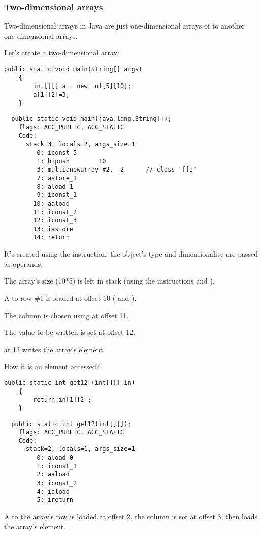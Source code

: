 \subsubsection{Two-dimensional arrays}

Two-dimensional arrays in Java are just one-dimensional arrays of  to another 
one-dimensional arrays.


Let's create a two-dimensional array:

\begin{lstlisting}[style=customjava]
	public static void main(String[] args)
	{
		int[][] a = new int[5][10];
		a[1][2]=3;
	}
\end{lstlisting}

\begin{lstlisting}
  public static void main(java.lang.String[]);
    flags: ACC_PUBLIC, ACC_STATIC
    Code:
      stack=3, locals=2, args_size=1
         0: iconst_5      
         1: bipush        10
         3: multianewarray #2,  2      // class "[[I"
         7: astore_1      
         8: aload_1       
         9: iconst_1      
        10: aaload        
        11: iconst_2      
        12: iconst_3      
        13: iastore       
        14: return        
\end{lstlisting}

It's created using the  instruction: the object's type and dimensionality are passed
as operands.

The array's size (10*5) is left in stack (using the instructions  and ).


A  to row \#1 is loaded at offset 10 ( and ).

The column is chosen using  at offset 11.

The value to be written is set at offset 12.

 at 13 writes the array's element.


How it is an element accessed?

\begin{lstlisting}[style=customjava]
	public static int get12 (int[][] in)
	{
		return in[1][2];
	}
\end{lstlisting}

\begin{lstlisting}
  public static int get12(int[][]);
    flags: ACC_PUBLIC, ACC_STATIC
    Code:
      stack=2, locals=1, args_size=1
         0: aload_0       
         1: iconst_1      
         2: aaload        
         3: iconst_2      
         4: iaload        
         5: ireturn       
\end{lstlisting}

A  to the array's row is loaded at offset 2, the column is set at offset 3, 
then  loads the array's element.

